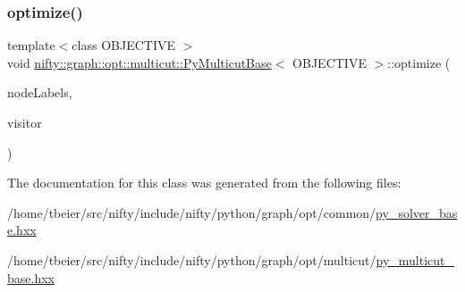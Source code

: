 \subsubsection{\texorpdfstring{optimize()}{optimize()}\hspace{0.1cm}{\footnotesize\ttfamily [2/2]}}
{\footnotesize\ttfamily template$<$class O\+B\+J\+E\+C\+T\+I\+VE $>$ \\
void \hyperlink{classnifty_1_1graph_1_1opt_1_1multicut_1_1PyMulticutBase}{nifty\+::graph\+::opt\+::multicut\+::\+Py\+Multicut\+Base}$<$ O\+B\+J\+E\+C\+T\+I\+VE $>$\+::optimize (\begin{DoxyParamCaption}\item[{\hyperlink{classnifty_1_1graph_1_1opt_1_1multicut_1_1PyMulticutBase_a34b9d7a58d056154c6b1abe7a83297c6}{Node\+Labels\+Type} \&}]{node\+Labels,  }\item[{\hyperlink{classnifty_1_1graph_1_1opt_1_1multicut_1_1PyMulticutBase_ac1d714affe7c2138ec75b9faad3000f6}{Visitor\+Base\+Type} $\ast$}]{visitor }\end{DoxyParamCaption})\hspace{0.3cm}{\ttfamily [inline]}}



The documentation for this class was generated from the following files\+:\begin{DoxyCompactItemize}
\item 
/home/tbeier/src/nifty/include/nifty/python/graph/opt/common/\hyperlink{py__solver__base_8hxx}{py\+\_\+solver\+\_\+base.\+hxx}\item 
/home/tbeier/src/nifty/include/nifty/python/graph/opt/multicut/\hyperlink{py__multicut__base_8hxx}{py\+\_\+multicut\+\_\+base.\+hxx}\end{DoxyCompactItemize}
